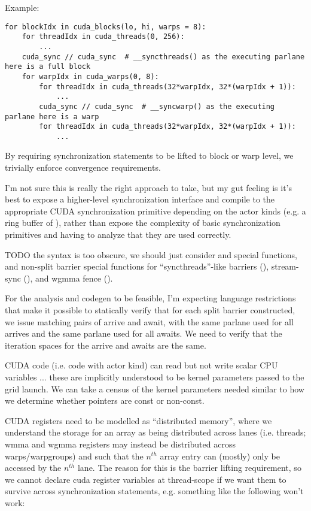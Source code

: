 \filbreak
Example:

{\color{lightttColor}
\begin{verbatim}
for blockIdx in cuda_blocks(lo, hi, warps = 8):
    for threadIdx in cuda_threads(0, 256):
        ...
    cuda_sync // cuda_sync  # __syncthreads() as the executing parlane here is a full block
    for warpIdx in cuda_warps(0, 8):
        for threadIdx in cuda_threads(32*warpIdx, 32*(warpIdx + 1)):
            ...
        cuda_sync // cuda_sync  # __syncwarp() as the executing parlane here is a warp
        for threadIdx in cuda_threads(32*warpIdx, 32*(warpIdx + 1)):
            ...
\end{verbatim}
}

By requiring synchronization statements to be lifted to block or warp level, we trivially enforce convergence requirements.

\filbreak
I'm not sure this is really the right approach to take, but my gut feeling is it's best to expose a higher-level synchronization interface and compile to the appropriate CUDA synchronization primitive depending on the actor kinds (e.g. a ring buffer of \mbarrier), rather than expose the complexity of basic synchronization primitives and having to analyze that they are used correctly.

\filbreak
TODO the \lighttt{//} syntax is too obscure, we should just consider  and  special functions, and non-split barrier special functions for ``syncthreads''-like barriers (), stream-sync (), and wgmma fence ().

\filbreak
{} For the analysis and codegen to be feasible, I'm expecting language restrictions that make it possible to statically verify that for each split barrier constructed, we issue matching pairs of arrive and await, with the same parlane used for all arrives and the same parlane used for all awaits.
We need to verify that the iteration spaces for the arrive and awaits are the same.

\filbreak
{} CUDA code (i.e. code with  actor kind) can read but not write scalar CPU variables ... these are implicitly understood to be kernel parameters passed to the grid launch.
We can take a census of the kernel parameters needed similar to how we determine whether pointers are const or non-const.

\filbreak
{} CUDA registers need to be modelled as ``distributed memory'', where we understand the storage for an array as being distributed across lanes (i.e. threads; wmma and wgmma registers may instead be distributed across warps/warpgroups) and such that the $n^{th}$ array entry can (mostly) only be accessed by the $n^{th}$ lane.
The reason for this is the barrier lifting requirement, so we cannot declare cuda register variables at thread-scope if we want them to survive across synchronization statements, e.g. something like the following won't work:

